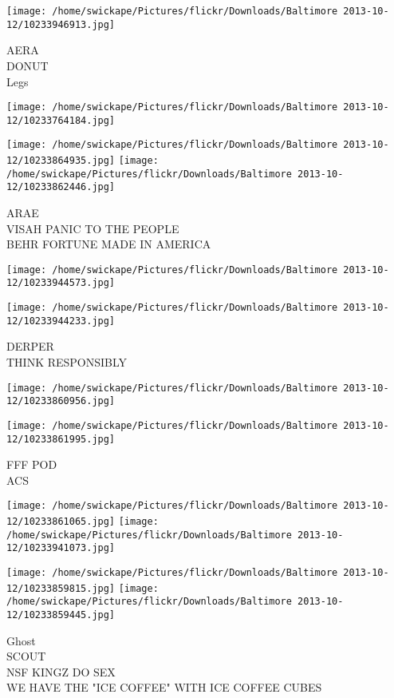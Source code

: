 \documentclass[10pt,letterpaper]{article}
\begin{document}
\texttt{[image: /home/swickape/Pictures/flickr/Downloads/Baltimore 2013-10-12/10233946913.jpg]}

AERA\\
DONUT\\
Legs
\pagebreak

\texttt{[image: /home/swickape/Pictures/flickr/Downloads/Baltimore 2013-10-12/10233764184.jpg]}

\vspace{0.25in}
\texttt{[image: /home/swickape/Pictures/flickr/Downloads/Baltimore 2013-10-12/10233864935.jpg]}
\texttt{[image: /home/swickape/Pictures/flickr/Downloads/Baltimore 2013-10-12/10233862446.jpg]}

ARAE\\
VISAH PANIC TO THE PEOPLE\\
BEHR FORTUNE MADE IN AMERICA
\pagebreak

\texttt{[image: /home/swickape/Pictures/flickr/Downloads/Baltimore 2013-10-12/10233944573.jpg]}

\vspace{0.25in}
\texttt{[image: /home/swickape/Pictures/flickr/Downloads/Baltimore 2013-10-12/10233944233.jpg]}

DERPER\\
THINK RESPONSIBLY
\pagebreak

\texttt{[image: /home/swickape/Pictures/flickr/Downloads/Baltimore 2013-10-12/10233860956.jpg]}

\vspace{0.25in}
\texttt{[image: /home/swickape/Pictures/flickr/Downloads/Baltimore 2013-10-12/10233861995.jpg]}

FFF POD\\
ACS
\pagebreak

\texttt{[image: /home/swickape/Pictures/flickr/Downloads/Baltimore 2013-10-12/10233861065.jpg]}
\texttt{[image: /home/swickape/Pictures/flickr/Downloads/Baltimore 2013-10-12/10233941073.jpg]}

\texttt{[image: /home/swickape/Pictures/flickr/Downloads/Baltimore 2013-10-12/10233859815.jpg]}
\texttt{[image: /home/swickape/Pictures/flickr/Downloads/Baltimore 2013-10-12/10233859445.jpg]}

Ghost\\
SCOUT\\
NSF KINGZ DO SEX\\
WE HAVE THE "ICE COFFEE" WITH ICE COFFEE CUBES
\pagebreak
\end{document}
